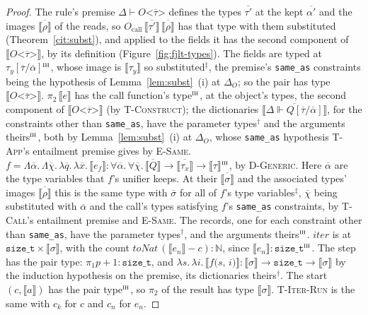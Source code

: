\begin{proof}
The rule's premise $\Delta \vdash O\texttt{<}\overline{\tau}\texttt{>}$ defines the types $\overline{\tau'}$ at the kept $\overline{\alpha'}$ and the images $\overline{\llbracket \rho \rrbracket}$ of the reads, so $O_{\mathrm{call}}\,\overline{\llbracket \tau' \rrbracket}\,\overline{\llbracket \rho \rrbracket}$ has that type with them substituted (Theorem~\ref{cit:subst}), and applied to the fields it has the second component of $\llbracket O\texttt{<}\overline{\tau}\texttt{>} \rrbracket$, by its definition (Figure~\ref{fig:fjlt-types}).
The fields are typed at $\tau_y[\overline{\tau}/\overline{\alpha}]$${}^{\textsc{ih}}$, whose image is $\llbracket \tau_y \rrbracket$ so substituted${}^{\ddagger}$, the premise's \texttt{same\_as} constraints being the hypothesis of Lemma~\ref{lem:subst}~(i) at $\Delta_O$; so the pair has type $\llbracket O\texttt{<}\overline{\tau}\texttt{>} \rrbracket$.
$\pi_2\,\llbracket e \rrbracket$ has the call function's type${}^{\textsc{ih}}$, at the object's types, the second component of $\llbracket O\texttt{<}\overline{\tau}\texttt{>} \rrbracket$ (by \textsc{T-Construct}); the dictionaries $\overline{\llbracket \Delta \Vdash Q[\overline{\tau}/\overline{\alpha}] \rrbracket}$, for the constraints other than \texttt{same\_as}, have the parameter types${}^{\dagger}$ and the arguments theirs${}^{\textsc{ih}}$, both by Lemma~\ref{lem:subst}~(i) at $\Delta_O$, whose \texttt{same\_as} hypothesis \textsc{T-App}'s entailment premise gives by \textsc{E-Same}.
$f = \Lambda\overline{\alpha}.\,\Lambda\overline{\chi}.\,\lambda\overline{q}.\,\lambda\overline{x}.\,\llbracket e_f \rrbracket : \forall\overline{\alpha}.\,\forall\overline{\chi}.\,\overline{\llbracket Q \rrbracket} \to \overline{\llbracket \tau_x \rrbracket} \to \llbracket \tau \rrbracket$${}^{\textsc{ih}}$, by \textsc{D-Generic}.
Here $\overline{\alpha}$ are the type variables that $f$'s unifier keeps.
At their $\overline{\llbracket \sigma \rrbracket}$ and the associated types' images $\overline{\llbracket \rho \rrbracket}$ this is the same type with $\overline{\sigma}$ for all of $f$'s type variables${}^{\ddagger}$, $\overline{\chi}$ being substituted with $\overline{\alpha}$ and the call's types satisfying $f$'s \texttt{same\_as} constraints, by \textsc{T-Call}'s entailment premise and \textsc{E-Same}.
The records, one for each constraint other than \texttt{same\_as}, have the parameter types${}^{\dagger}$, and the arguments theirs${}^{\textsc{ih}}$.
$\mathit{iter}$ is at $\texttt{size\_t} \times \llbracket \sigma \rrbracket$, with the count $\mathit{toNat}\,(\llbracket e_n \rrbracket - c) : \mathbb{N}$, since $\llbracket e_n \rrbracket : \texttt{size\_t}$${}^{\textsc{ih}}$.
The step has the pair type: $\pi_1 p + 1 : \texttt{size\_t}$, and $\lambda s.\,\lambda i.\,\llbracket f\texttt{(}s\texttt{, }i\texttt{)} \rrbracket : \llbracket \sigma \rrbracket \to \texttt{size\_t} \to \llbracket \sigma \rrbracket$ by the induction hypothesis on the premise, its dictionaries theirs${}^{\dagger}$.
The start $(c, \llbracket a \rrbracket)$ has the pair type${}^{\textsc{ih}}$, so $\pi_2$ of the result has type $\llbracket \sigma \rrbracket$.
\textsc{T-Iter-Run} is the same with $c_k$ for $c$ and $c_n$ for $e_n$.


\end{proof}

